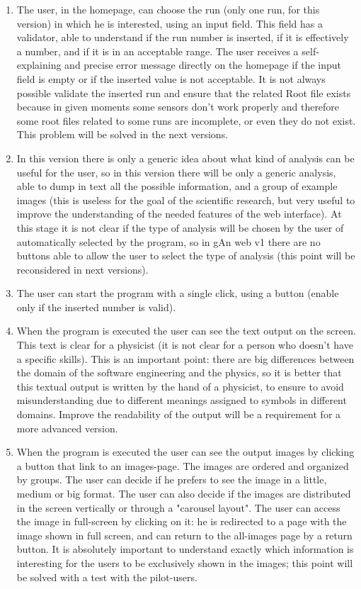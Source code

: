\begin{enumerate}

\item The user, in the homepage, can choose the run (only one run, for this version) in which he is interested, using an input field. This field has a validator, able to understand if the run number is inserted, if it is effectively a number, and if it is in an acceptable range. The user receives a self-explaining and precise error message directly on the homepage if the input field is empty or if the inserted value is not acceptable. It is not always possible validate the inserted run and ensure that the related Root file exists because in given moments some sensors don't work properly and therefore some root files related to some runs are incomplete, or even they do not exist. This problem will be solved in the next versions.

\item In this version there is only a generic idea about what kind of analysis can be useful for the user, so in this version there will be only a generic analysis, able to dump in text all the possible information, and a group of example images (this is useless for the goal of the scientific research, but very useful to improve the understanding of the needed features of the web interface).
At this stage it is not clear if the type of analysis will be chosen by the user of automatically selected by the program, so in gAn web v1 there are no buttons able to allow the user to select the type of analysis (this point will be reconsidered in next versions).

\item The user can start the program with a single click, using a button (enable only if the inserted number is valid).

\item When the program is executed the user can see the text output on the screen. This text is clear for a physicist (it is not clear for a person who doesn't have a specific skills). This is an important point: there are big differences between the domain of the software engineering and the physics, so it is better that this textual output is written by the hand of a physicist, to ensure to avoid misunderstanding due to different meanings assigned to symbols in different domains. Improve the readability of the output will be a requirement for a more advanced version. 

\item When the program is executed the user can see the output images by clicking a button that link to an images-page. The images are ordered and organized by groups. The user can decide if he prefers to see the image in a little, medium or big format. The user can also decide if the images are distributed in the screen vertically or through a "carousel layout". The user can access the image in full-screen by clicking on it: he is redirected to a page with the image shown in full screen, and can return to the all-images page by a return button. It is absolutely important to understand exactly which information is interesting for the users to be exclusively shown in the images; this point will be solved with a test with the pilot-users. 


\end{enumerate}
